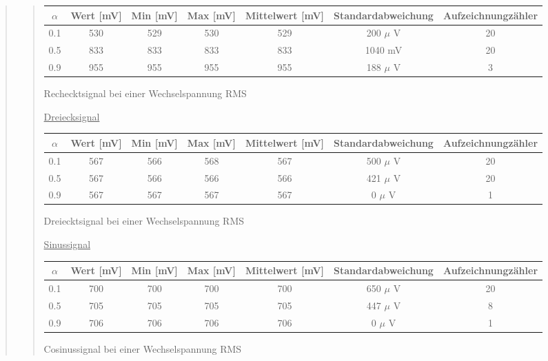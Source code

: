 \begin{quote}
\begin{quote}
			\hspace{-4em}
                  \begin{tabular}{|c|c|c|c|c|c|c|}
                  \hline
                   $\alpha $ & Wert [mV] & Min [mV] & Max [mV] & Mittelwert
                   [mV] & Standardabweichung & Aufzeichnungzähler\\ \hline 
                   0.1 & 530 & 529 & 530 & 529 & 200 $\mu$ V & 20 \\ \hline
                   0.5 & 833 & 833 & 833 & 833 & 1040 mV & 20 \\ \hline
                   0.9 & 955 & 955 & 955 & 955 & 188 $\mu$ V & 3 \\ \hline           
                 \end{tabular}
                       \caption{Rechecktsignal bei einer Wechselspannung RMS}
                        \label{tablelabel1}
        
 
 	\vspace{1.5em}
 	             
    \underline{Dreiecksignal}
		
            \hspace{-4em}           
                 \begin{tabular}{|c|c|c|c|c|c|c|}                 
                  \hline
                   $\alpha $ & Wert [mV] & Min [mV] & Max [mV] & Mittelwert [mV]
                   & Standardabweichung & Aufzeichnungzähler\\ \hline 
                   0.1 & 567 & 566 & 568 & 567 & 500 $\mu$ V & 20 \\ \hline
                   0.5 & 567 & 566 & 566 & 566 & 421 $\mu$ V & 20 \\ \hline
                   0.9 & 567 & 567 & 567 & 567 & 0 $\mu$ V & 1 \\ \hline
                 \end{tabular}
                       \caption{Dreiecktsignal bei einer Wechselspannung RMS}
                        \label{tablelabel2}
             
     
 	\vspace{1.5em}
 	         
    \underline{Sinussignal}
		
            \hspace{-4em}                 
                 \begin{tabular}{|c|c|c|c|c|c|c|}
                  \hline
                   $\alpha $ & Wert [mV] & Min [mV] & Max [mV] & Mittelwert [mV]
                   & Standardabweichung & Aufzeichnungzähler\\ \hline 
                   0.1 & 700 & 700 & 700 & 700 & 650 $\mu$ V & 20 \\ \hline
                   0.5 & 705 & 705 & 705 & 705 & 447 $\mu$ V & 8 \\ \hline
                   0.9 & 706 & 706 & 706 & 706 & 0 $\mu$ V & 1 \\ \hline
                 \end{tabular}          
                       \caption{Cosinussignal bei einer Wechselspannung RMS}
                        \label{tablelabel3}
            

\end{quote}
\end{quote}
